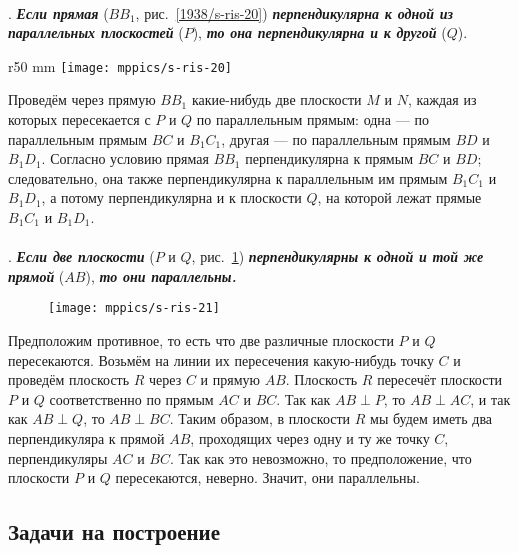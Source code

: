 \paragraph{}\label{1938/s33}
.
\textbf{\emph{Если прямая}} ($BB_1$, рис.~\ref{1938/s-ris-20}) \textbf{\emph{перпендикулярна к одной из параллельных плоскостей}} ($P$), \textbf{\emph{то она перпендикулярна и к другой}} ($Q$).

\begin{wrapfigure}{r}{50 mm}
\vskip-4mm
\centering
\texttt{[image: mppics/s-ris-20]}
\caption{}\label{1938/s-ris-20}
\end{wrapfigure}

Проведём через прямую $BB_1$ какие-нибудь две плоскости $M$ и $N$, каждая из которых пересекается с $P$ и $Q$ по параллельным прямым: одна — по параллельным прямым $BC$ и $B_1C_1$, другая — по параллельным прямым $BD$ и $B_1D_1$.
Согласно условию прямая $BB_1$ перпендикулярна к прямым $BC$ и $BD$;
следовательно, она также перпендикулярна к параллельным им прямым $B_1C_1$ и $B_1D_1$, а потому перпендикулярна и к плоскости $Q$, на которой лежат прямые $B_1C_1$ и $B_1D_1$.

\paragraph{}\label{1938/s34}
.
\textbf{\emph{Если две плоскости}} ($P$ и $Q$, рис.~\ref{1938/s-ris-21}) \textbf{\emph{перпендикулярны к одной и той же прямой}} ($AB$), \textbf{\emph{то они параллельны.}}

\begin{figure}[!ht]
\centering
\texttt{[image: mppics/s-ris-21]}
\caption{}\label{1938/s-ris-21}
\end{figure}

Предположим противное, то есть что две различные плоскости $P$ и $Q$ пересекаются.
Возьмём на линии их пересечения какую-нибудь точку $C$ и проведём плоскость $R$ через $C$ и прямую $AB$.
Плоскость $R$ пересечёт плоскости $P$ и $Q$ соответственно по прямым $AC$ и $BC$.
Так как $AB\perp P$, то $AB\perp AC$, и так как $AB\perp Q$, то $AB\perp BC$.
Таким образом, в плоскости $R$ мы будем иметь два перпендикуляра к прямой $AB$, проходящих через одну и ту же точку $C$, перпендикуляры $AC$ и $BC$.
Так как это невозможно, то предположение, что плоскости $P$ и $Q$ пересекаются, неверно.
Значит, они параллельны.

\subsection*{Задачи на построение}

